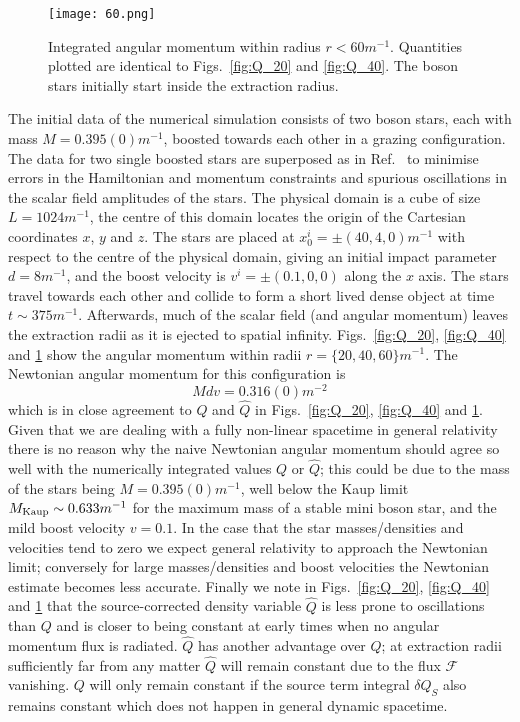 \begin{figure}[h!]
{\texttt{[image: 60.png]}}
\caption{ Integrated angular momentum within radius $r<60 m^{-1}$. Quantities plotted are identical to Figs.~\ref{fig:Q_20} and \ref{fig:Q_40}. The boson stars initially start inside the extraction radius.  }
\label{fig:Q_60}
\end{figure}


The initial data of the numerical simulation consists of two boson stars, each with mass $M=0.395(0)m^{-1}$, boosted towards each other in a grazing configuration. The data for two single boosted stars are superposed as in Ref.~\cite{helfer2021malaise} to minimise errors in the Hamiltonian and momentum constraints and spurious oscillations in the scalar field amplitudes of the stars. 
The physical domain is a cube of size $L=1024 m^{-1}$, the centre of this domain locates the origin of the Cartesian coordinates $x$, $y$ and $z$. The stars are placed at $x_0^i=\pm(40,4,0)m^{-1}$ with respect to the centre of the physical domain, giving an initial impact parameter $d=8m^{-1}$, and the boost velocity is $v^i=\pm(0.1,0,0)$ along the $x$ axis. The stars travel towards each other and collide to form a short lived dense object at time $t \sim 375 m^{-1}$. Afterwards, much of the scalar field (and angular momentum) leaves the extraction radii as it is ejected to spatial infinity. Figs.~\ref{fig:Q_20}, \ref{fig:Q_40} and \ref{fig:Q_60} show the angular momentum within radii $r = \{20,40,60\}m^{-1}$. The Newtonian angular momentum for this configuration is 
\begin{equation}\label{eq:newtQ}Mdv=0.316(0) m^{-2}\end{equation}
 which is in close agreement to $Q$ and $\hat{Q}$ in Figs.~\ref{fig:Q_20}, \ref{fig:Q_40} and \ref{fig:Q_60}. Given that we are dealing with a fully non-linear spacetime in general relativity there is no reason why the naive Newtonian angular momentum should agree so well with the numerically integrated values $Q$ or $\hat{Q}$; this could be due to the mass of the stars being $M=0.395(0) m^{-1}$, well below the Kaup limit $M_{\rm{Kaup}} \sim 0.633 m^{-1}$ \cite{liebling2017dynamical} for the maximum mass of a stable mini boson star, and the mild boost velocity $v=0.1$. In the case that the star masses/densities and velocities tend to zero we expect general relativity to approach the Newtonian limit; conversely for large masses/densities and boost velocities the Newtonian estimate becomes less accurate. Finally we note in Figs.~\ref{fig:Q_20}, \ref{fig:Q_40} and \ref{fig:Q_60} that the source-corrected density variable $\hat{Q}$ is less prone to oscillations than $Q$ and is closer to being constant at early times when no angular momentum flux is radiated. $\hat{Q}$ has another advantage over $Q$; at extraction radii sufficiently far from any matter $\hat{Q}$ will remain constant due to the flux $\mathcal{F}$ vanishing. $Q$ will only remain constant if the source term integral $\delta Q_S$ also remains constant which does not happen in general dynamic spacetime.




